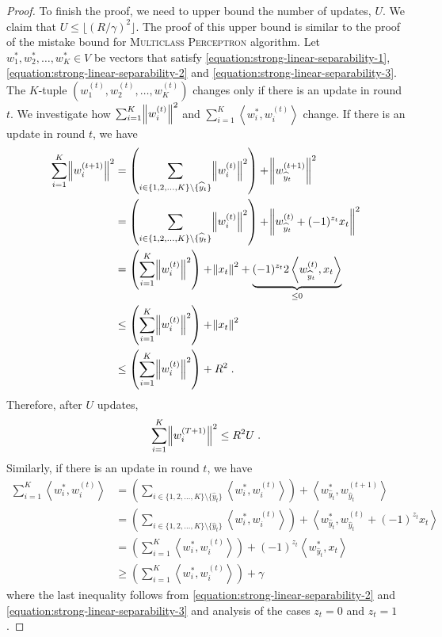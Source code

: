 \documentclass[12pt]{article}
\newcommand{\ip}[2]{\left\langle #1, #2 \right\rangle} %
\begin{document}
\begin{proof}
To finish the proof, we need to upper bound the number of updates, $U$. We claim
that $U \le \lfloor (R/\gamma)^2 \rfloor$. The proof of this upper bound is
similar to the proof of the mistake bound for \textsc{Multiclass Perceptron}
algorithm. Let $w_1^*, w_2^*, \dots, w_K^* \in V$ be vectors that satisfy
\eqref{equation:strong-linear-separability-1},
\eqref{equation:strong-linear-separability-2} and
\eqref{equation:strong-linear-separability-3}.
The $K$-tuple $(w_1^{(t)}, w_2^{(t)}, \dots, w_K^{(t)})$
changes only if there is an update in round $t$.
We investigate how $\sum_{i=1}^K \norm{w_i^{(t)}}^2$ and
$\sum_{i=1}^K \ip{w_i^*}{w_i^{(t)}}$ change. If there is an update in round $t$,
we have
\begingroup
\allowdisplaybreaks
\begin{align*}
\sum_{i=1}^K \norm{w_i^{(t+1)}}^2
& = \left( \sum_{i \in \{1,2,\dots,K\} \setminus \{\widehat y_t\}} \norm{w_i^{(t)}}^2 \right) + \norm{w_{\widehat y_t}^{(t+1)}}^2 \\
& = \left( \sum_{i \in \{1,2,\dots,K\} \setminus \{\widehat y_t\}} \norm{w_i^{(t)}}^2 \right) + \norm{w_{\widehat y_t}^{(t)} + (-1)^{z_t} x_t}^2 \\
& = \left( \sum_{i=1}^K \norm{w_i^{(t)}}^2 \right) + \norm{x_t}^2 + \underbrace{(-1)^{z_t} 2 \ip{w_{\widehat y_t}^{(t)}}{x_t}}_{\le 0} \\
& \le \left( \sum_{i=1}^K \norm{w_i^{(t)}}^2 \right) + \norm{x_t}^2 \\
& \le \left( \sum_{i=1}^K \norm{w_i^{(t)}}^2 \right) + R^2 \; .
\end{align*}
\endgroup
Therefore, after $U$ updates,
$$
\sum_{i=1}^K \norm{w_i^{(T+1)}}^2 \le R^2 U \; .
$$
Similarly, if there is an update in round $t$, we have
\begin{align*}
\sum_{i=1}^K \ip{w_i^*}{w_i^{(t)}}
& = \left( \sum_{i \in \{1,2,\dots,K\} \setminus \{\widehat y_t\}} \ip{w_i^*}{w_i^{(t)}} \right) + \ip{w_{\widehat y_t}^*}{w_{\widehat y_t}^{(t+1)}} \\
& = \left( \sum_{i \in \{1,2,\dots,K\} \setminus \{\widehat y_t\}} \ip{w_i^*}{w_i^{(t)}} \right) + \ip{w_{\widehat y_t}^*}{w_{\widehat y_t}^{(t)} + (-1)^{z_t} x_t} \\
& = \left( \sum_{i=1}^K \ip{w_i^*}{w_i^{(t)}} \right) + (-1)^{z_t} \ip{w_{\widehat y_t}^*}{x_t} \\
& \ge \left( \sum_{i=1}^K \ip{w_i^*}{w_i^{(t)}} \right) + \gamma
\end{align*}
where the last inequality follows from \eqref{equation:strong-linear-separability-2}
and \eqref{equation:strong-linear-separability-3} and analysis of the cases $z_t = 0$ and $z_t = 1$.

\end{proof}
\end{document}
